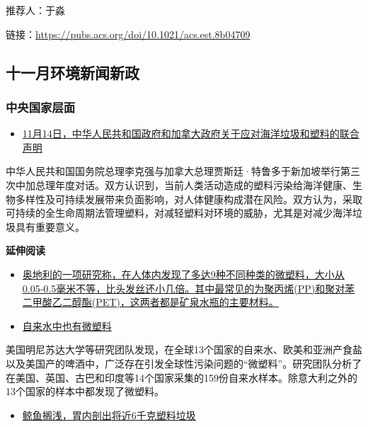 \documentclass[]{book}
\providecommand{\tightlist}{%
  \setlength{\itemsep}{0pt}\setlength{\parskip}{0pt}}
\begin{document}
推荐人：于淼

链接：\url{https://pubs.acs.org/doi/10.1021/acs.est.8b04709}

\hypertarget{ux5341ux4e00ux6708ux73afux5883ux65b0ux95fbux65b0ux653f}{%
\subsection*{十一月环境新闻新政}\label{ux5341ux4e00ux6708ux73afux5883ux65b0ux95fbux65b0ux653f}}

\hypertarget{ux4e2dux592eux56fdux5bb6ux5c42ux9762}{%
\subsubsection*{中央国家层面}\label{ux4e2dux592eux56fdux5bb6ux5c42ux9762}}

\begin{itemize}
\tightlist
\item
  \href{https://www.mfa.gov.cn/web/ziliao_674904/1179_674909/t1613067.shtml}{11月14日，中华人民共和国政府和加拿大政府关于应对海洋垃圾和塑料的联合声明}
\end{itemize}

中华人民共和国国务院总理李克强与加拿大总理贾斯廷·特鲁多于新加坡举行第三次中加总理年度对话。双方认识到，当前人类活动造成的塑料污染给海洋健康、生物多样性及可持续发展带来负面影响，对人体健康构成潜在风险。双方认为，采取可持续的全生命周期法管理塑料，对减轻塑料对环境的威胁，尤其是对减少海洋垃圾具有重要意义。

\textbf{延伸阅读}

\begin{itemize}
\item
  \href{http://tech.ifeng.com/a/20181028/45202181_0.shtml}{奥地利的一项研究称，在人体内发现了多达9种不同种类的微塑料，大小从0.05-0.5毫米不等，比头发丝还小几倍。其中最常见的为聚丙烯(PP)和聚对苯二甲酸乙二醇酯(PET)，这两者都是矿泉水瓶的主要材料。}
\item
  \href{http://news.ifeng.com/a/20180906/60032654_0.shtml}{自来水中也有微塑料}
\end{itemize}

美国明尼苏达大学等研究团队发现，在全球13个国家的自来水、欧美和亚洲产食盐以及美国产的啤酒中，广泛存在引发全球性污染问题的``微塑料''。研究团队分析了在美国、英国、古巴和印度等14个国家采集的159份自来水样本。除意大利之外的13个国家的样本中都发现了微塑料。

\begin{itemize}
\tightlist
\item
  \href{https://baijiahao.baidu.com/s?id=1617711608828470969\&wfr=spider\&for=pc}{鲸鱼搁浅，胃内剖出将近6千克塑料垃圾}
\end{itemize}
\end{document}
